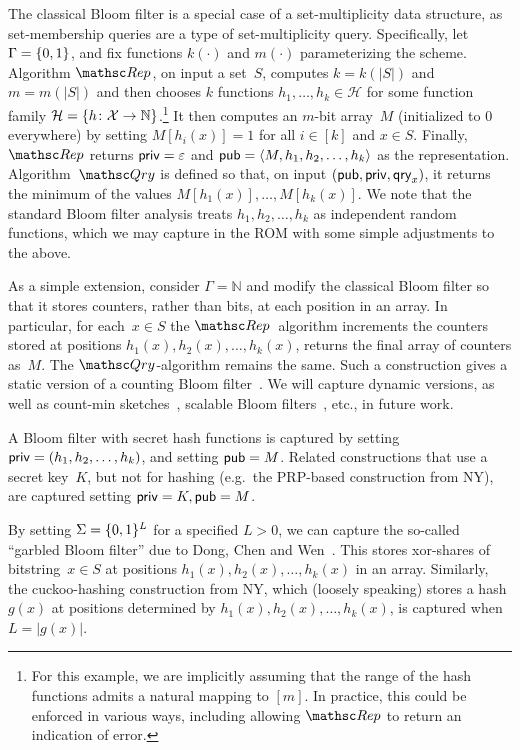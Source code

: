 The classical Bloom filter is a special case of a set-multiplicity
data structure, as set-membership queries are a type of
set-multiplicity query.  Specifically,
let $\Gamma=\{0,1\}$, and fix functions $k(\cdot)$ and $m(\cdot)$
parameterizing the scheme.  Algorithm $\Rep$, on input a set~$S$,
computes $k=k(|S|)$ and $m=m(|S|)$ and then chooses $k$ functions
$h_1, \ldots, h_k \in \mathcal{H}$ for some function family
$\mathcal{H}=\{h \colon {\cal X} \to \mathbb{N}\}$.\footnote{For this
  example, we are implicitly assuming that the range of the hash
  functions admits a natural mapping to $[m]$.  In practice, this
  could be enforced in various ways, including allowing $\Rep$ to
  return an indication of error. }
It then computes an $m$-bit
array~$M$ (initialized to 0 everywhere) by setting $M[h_i(x)]=1$ for
all $i\in [k]$ and $x \in S$.  Finally, $\Rep$ returns
${\sf priv}=\varepsilon$ and ${\sf pub} = \langle
M,h_1,h_2,\ldots,h_k\rangle$ as the representation.
%
Algorithm~$\Qry$ is defined so that, on input
$({\sf pub},{\sf priv},\mathsf{qry}_x)$, it returns the minimum of the values
$M[h_1(x)],\ldots,M[h_k(x)]$.  We note that the standard Bloom filter
analysis treats $h_1,h_2,\ldots,h_k$ as independent random functions,
which we may capture in the ROM with some simple adjustments to the above.

As a simple extension, consider $\Gamma=\mathbb{N}$ and modify the
classical Bloom filter so that it stores counters, rather than bits, at
each position in an array.  In particular, for each~$x \in S$ the
$\Rep$~algorithm increments the counters stored at positions
$h_1(x), h_2(x), \ldots, h_k(x)$, returns the final array of
counters as~$M$.  The $\Qry$-algorithm remains the same. Such a
construction gives a static version of a counting Bloom
filter~\cite{fan2000summary}.  We will capture dynamic versions, as well as
count-min sketches~\cite{cormode2005improved}, scalable Bloom filters~\cite{almeida2007scalable},
etc., in future work.

A Bloom filter with secret hash functions is captured by setting
${\sf priv}=(h_1,h_2,\ldots,h_k)$, and setting ${\sf pub}=M$.
Related constructions that use a secret key~$K$, but not for hashing (e.g.\ the PRP-based
construction from NY), are captured setting ${\sf priv}=K, {\sf pub}=M$.

By setting $\Sigma=\{0,1\}^L$ for a specified $L>0$, we can capture
the so-called ``garbled Bloom filter'' due to Dong, Chen and
Wen~\cite{dong2013private}.  This stores
xor-shares of bitstring~$x \in S$ at positions
$h_1(x),h_2(x),\ldots,h_k(x)$ in an array. Similarly, the
cuckoo-hashing construction from NY, which (loosely speaking) stores
a hash $g(x)$ at positions determined by
$h_1(x),h_2(x),\ldots,h_k(x)$, is captured when $L=|g(x)|$.
